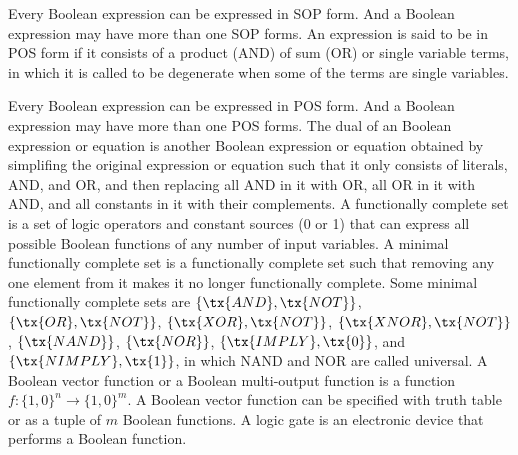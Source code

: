 \documentclass[a4paper,12pt]{article}
\begin{document}
\begin{itemize}
\begin{itemize}
\begin{itemize}
\begin{itemize}
\begin{itemize}
\begin{itemize}
\begin{itemize}
Every Boolean expression can be expressed in SOP form. And a Boolean expression may have more than one SOP forms.
An expression is said to be in POS form if it consists of a product (AND) of sum (OR) or single variable terms, in which it is called to be degenerate when some of the terms are single variables.

Every Boolean expression can be expressed in POS form. And a Boolean expression may have more than one POS forms.
The dual of an Boolean expression or equation is another Boolean expression or equation obtained by simplifing the original expression or equation such that it only consists of literals, AND, and OR, and then replacing all AND in it with OR, all OR in it with AND, and all constants in it with their complements.
A functionally complete set is a set of logic operators and constant sources (0 or 1) that can express all possible Boolean functions of any number of input variables. A minimal functionally complete set is a functionally complete set such that removing any one element from it makes it no longer functionally complete. Some minimal functionally complete sets are $\{\tx{AND},\tx{NOT}\}$, $\{\tx{OR},\tx{NOT}\}$, $\{\tx{XOR},\tx{NOT}\}$, $\{\tx{XNOR},\tx{NOT}\}$, $\{\tx{NAND}\}$, $\{\tx{NOR}\}$, $\{\tx{IMPLY},\tx{0}\}$, and $\{\tx{NIMPLY},\tx{1}\}$, in which NAND and NOR are called universal.
A Boolean vector function or a Boolean multi-output function is a function $f\colon\{1,0\}^n\to\{1,0\}^m$. A Boolean vector function can be specified with truth table or as a tuple of $m$ Boolean functions.
A logic gate is an electronic device that performs a Boolean function.


\end{itemize}
\end{itemize}
\end{itemize}
\end{itemize}
\end{itemize}
\end{itemize}
\end{itemize}
\end{document}
